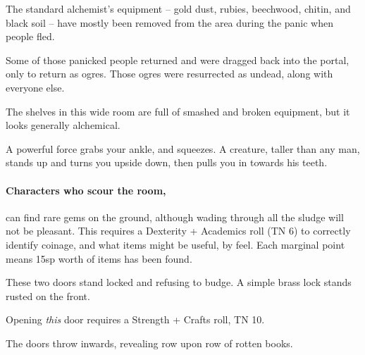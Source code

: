 \begin{multicols}{2}
The standard alchemist's equipment -- gold dust, rubies, beechwood, chitin, and black soil -- have mostly been removed from the area during the panic when people fled.

Some of those panicked people returned and were dragged back into the portal, only to return as ogres.
Those ogres were resurrected as undead, along with everyone else.

\begin{boxtext}

  The shelves in this wide room are full of smashed and broken equipment, but it looks generally alchemical.

\end{boxtext}

\begin{boxtext}

  A powerful force grabs your ankle, and squeezes.
  A creature, taller than any man, stands up and turns you upside down, then pulls you in towards his teeth.

\end{boxtext}



\paragraph{Characters who scour the room,}
can find rare gems on the ground, although wading through all the sludge will not be pleasant.
This requires a Dexterity + Academics roll (TN 6) to correctly identify coinage, and what items might be useful, by feel.
Each marginal point means 15sp worth of items has been found.


\begin{boxtext}

  These two doors stand locked and refusing to budge.  A simple brass lock stands rusted on the front.

\end{boxtext}

Opening \emph{this} door requires a Strength + Crafts roll, TN 10.

\begin{boxtext}
  The doors throw inwards, revealing row upon row of rotten books.
\end{boxtext}


\end{multicols}
